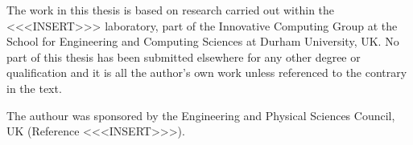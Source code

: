 \setcounter{page}{1}
\pagestyle{plain}


\maketitle

\begin{abstract}
    \Blindtext[2]
\end{abstract}

\begin{declaration}
    The work in this thesis is based on research carried out within the <<<INSERT>>> laboratory, part of the Innovative Computing Group at the School for Engineering and Computing Sciences at Durham University, UK. No part of this thesis has been submitted elsewhere for any other degree or qualification and it is all the author's own work unless referenced to the contrary in the text.
\end{declaration}

\begin{acknowledgements}
    The authour was sponsored by the Engineering and Physical Sciences Council, UK (Reference <<<INSERT>>>).

    \Blindtext[1]
\end{acknowledgements}

\tableofcontents
\listoffigures
\listoftables
\listofalgorithms

\clearpage
\pagestyle{fancy}

\setcounter{page}{1}
